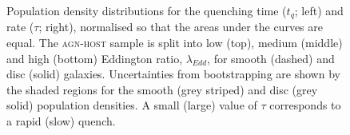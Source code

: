 \begin{figure}
\caption[Quenching time and rate population density distributions for the \textsc{agn-host} sample split by Eddington ratio]{Population density distributions for the quenching time ($t_q$; left) and rate ($\tau$; right), normalised so that the areas under the curves are equal. The \textsc{agn-host} sample is split into low (top), medium (middle) and high (bottom) Eddington ratio, $\lambda_{Edd}$, for smooth (dashed) and disc (solid) galaxies. Uncertainties from bootstrapping are shown by the shaded regions for the smooth (grey striped) and disc (grey solid) population densities. A small (large) value of $\tau$ corresponds to a rapid (slow) quench.}
\label{eddratiosplit}
\end{figure}

